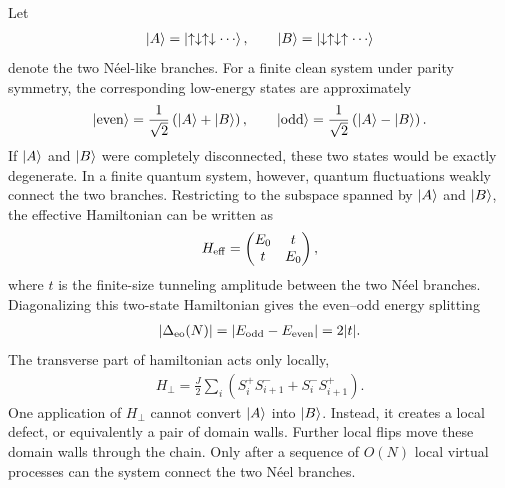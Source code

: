 \documentclass[11pt]{article}
\begin{document}
Let
\begin{align}
    \ket{A}
    =
    \ket{\uparrow\downarrow\uparrow\downarrow\cdots},
    \qquad
    \ket{B}
    =
    \ket{\downarrow\uparrow\downarrow\uparrow\cdots}
\end{align}
denote the two N\'eel-like branches. For a finite clean system under parity symmetry, the corresponding low-energy
states are approximately
\begin{align}
    \ket{\rm even}
    =
    \frac{1}{\sqrt{2}}
    \left(
    \ket{A}
    +
    \ket{B}
    \right),
    \qquad
    \ket{\rm odd}
    =
    \frac{1}{\sqrt{2}}
    \left(
    \ket{A}
    -
    \ket{B}
    \right).
\end{align}
If $\ket{A}$ and $\ket{B}$ were completely disconnected, these two states would be exactly
degenerate. In a finite quantum system, however, quantum fluctuations weakly connect the
two branches. Restricting to the subspace spanned by $\ket{A}$ and $\ket{B}$, the effective
Hamiltonian can be written as
\begin{align}
    H_{\rm eff}
    =
    \begin{pmatrix}
        E_0 & t \\
        t & E_0
    \end{pmatrix},
    \label{eq:two_state_heff}
\end{align}
where $t$ is the finite-size tunneling amplitude between the two N\'eel branches. 
Diagonalizing this two-state Hamiltonian gives the even--odd energy splitting
\begin{align}
    |\Delta_{\rm eo}(N)|
    =
    |E_{\rm odd}-E_{\rm even}|
    =
    2|t|.
\end{align}
The transverse part of hamiltonian acts only locally,
\begin{align}
    H_\perp
    =
    \frac{J}{2}
    \sum_i
    \left(
        S_i^+S_{i+1}^-
        +
        S_i^-S_{i+1}^+
    \right).
\end{align} 
One application of $H_\perp$ cannot convert $\ket{A}$ into
$\ket{B}$. Instead, it creates a local defect, or equivalently a pair of domain
walls. Further local flips move these domain walls through the chain. Only after
a sequence of $O(N)$ local virtual processes can the system connect the two
N\'eel branches.
\end{document}
